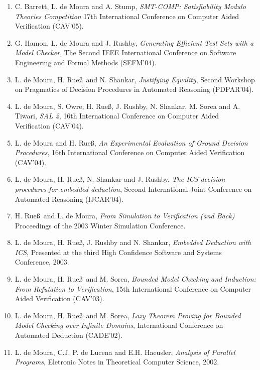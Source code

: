 \documentclass{article}
\begin{document}
\begin{enumerate}
\item C. Barrett, L. de Moura and A. Stump,
{\em SMT-COMP: Satisfiability Modulo Theories Competition}
17th International Conference on Computer Aided Verification (CAV'05).

\item G. Hamon, L. de Moura and J. Rushby,
{\em Generating Efficient Test Sets with a Model Checker},
The Second IEEE International Conference on Software Engineering and Formal Methods (SEFM'04).

\item L. de Moura, H. Rue\ss\ and N. Shankar,
{\em Justifying Equality},
Second Workshop on Pragmatics of Decision Procedures in Automated Reasoning (PDPAR'04).

\item L. de Moura, S. Owre, H. Rue\ss, J. Rushby, N. Shankar, M. Sorea and A. Tiwari,
{\em SAL 2},
16th International Conference on Computer Aided Verification (CAV'04).

\item L. de Moura and H. Rue\ss,
{\em An Experimental Evaluation of Ground Decision Procedures},
16th International Conference on Computer Aided Verification (CAV'04).

\item L. de Moura, H. Rue\ss, N. Shankar and J. Rushby,
{\em The ICS decision procedures for embedded deduction},
Second International Joint Conference on Automated Reasoning (IJCAR'04).

\item H. Rue\ss\ and L. de Moura,
{\em From Simulation to Verification (and Back)}
Proceedings of the 2003 Winter Simulation Conference.

\item L. de Moura, H. Rue\ss, J. Rushby and N. Shankar,
{\em Embedded Deduction with ICS},
Presented at the third High Confidence Software and Systems Conference, 2003.

\item L. de Moura, H. Rue\ss\ and M. Sorea,
{\em Bounded Model Checking and Induction: From Refutation to Verification},
15th International Conference on Computer Aided Verification (CAV'03).

\item L. de Moura, H. Rue\ss\ and M. Sorea,
{\em Lazy Theorem Proving for Bounded Model Checking over Infinite Domains},
International Conference on Automated Deduction (CADE'02).

\item L. de Moura, C.J. P. de Lucena and E.H. Haeusler,
{\em Analysis of Parallel Programs},
Eletronic Notes in Theoretical Computer Science, 2002.


\end{enumerate}
\end{document}
